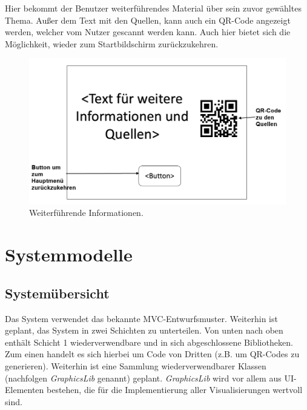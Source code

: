 \documentclass{article}
\begin{document}
Hier bekommt der Benutzer weiterführendes Material über sein zuvor gewähltes Thema. Außer dem Text mit den Quellen, kann auch ein QR-Code angezeigt werden, welcher vom Nutzer gescannt werden kann. Auch hier bietet sich die Möglichkeit, wieder zum Startbildschirm zurückzukehren.

\begin{figure}[H]
  \centering
    \includegraphics[width=\textwidth]{resources/ui_walkthrough_other}
  \caption{Weiterführende Informationen.}
\end{figure}


\section{Systemmodelle}

\subsection{Systemübersicht}
Das System verwendet das bekannte MVC-Entwurfsmuster. Weiterhin ist geplant, das System in zwei Schichten zu unterteilen. Von unten nach oben enthält Schicht 1 wiederverwendbare und in sich abgeschlossene Bibliotheken. Zum einen handelt es sich hierbei um Code von Dritten (z.B. um QR-Codes zu generieren). Weiterhin ist eine Sammlung wiederverwendbarer Klassen (nachfolgen {\it GraphicsLib} genannt) geplant. {\it GraphicsLib} wird vor allem aus \gls{UI}-Elementen bestehen, die für die Implementierung aller Visualisierungen wertvoll sind.
\end{document}

